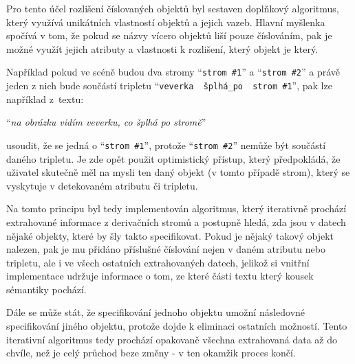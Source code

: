 Pro tento účel rozlišení číslovaných objektů byl sestaven doplňkový algoritmus,
který využívá unikátních vlastností objektů a jejich vazeb.
Hlavní myšlenka spočívá v tom, že pokud se názvy vícero objektů liší pouze číslováním,
pak je možné využít jejich atributy a vlastnosti k rozlišení, který objekt je který.

Například pokud ve scéně budou dva stromy \enquote{\texttt{strom \#1}} a \enquote{\texttt{strom \#2}} a právě jeden z nich
bude součástí tripletu \enquote{\texttt{veverka \to\ šplhá\_po \to\ strom \#1}}, pak lze například z~textu:
\begin{center}
	\enquote{\emph{na obrázku vidím veverku, co šplhá po stromě}}
\end{center}
usoudit, že se jedná o \enquote{\texttt{strom \#1}}, protože \enquote{\texttt{strom \#2}} nemůže být součástí daného tripletu.
Je zde opět použit optimistický přístup, který předpokládá, že uživatel skutečně měl na mysli ten daný objekt (v tomto případě strom),
který se vyskytuje v detekovaném atributu či tripletu.

Na tomto principu byl tedy implementován algoritmus, který iterativně prochází extrahované informace z derivačních stromů
a postupně hledá, zda jsou v datech nějaké objekty, které by šly takto specifikovat.
Pokud je nějaký takový objekt nalezen, pak je mu přidáno příslušné číslování nejen v daném atributu nebo tripletu,
ale i ve všech ostatních extrahovaných datech, jelikož si vnitřní implementace udržuje informace o tom,
ze které části textu který kousek sémantiky pochází.

Dále se může stát, že specifikování jednoho objektu umožní následovné specifikování jiného objektu, protože dojde k eliminaci ostatních možností.
Tento iterativní algoritmus tedy prochází opakovaně všechna extrahovaná data až do chvíle,
než je celý průchod beze změny - v ten okamžik proces končí.

